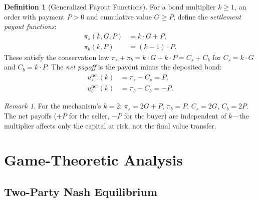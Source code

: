 \documentclass[11pt,a4paper]{article}
\theoremstyle{definition}
\newtheorem{definition}[theorem]{Definition}
\theoremstyle{remark}
\newtheorem{remark}[theorem]{Remark}
\newcommand{\pay}{P}           %
\newcommand{\cumval}{G}        %
\newcommand{\sbond}{C_s}       %
\newcommand{\bbond}{C_b}       %
\newcommand{\spay}{\pi_s}      %
\newcommand{\bpay}{\pi_b}      %
\newcommand{\ub}{u_b}          %
\newcommand{\us}{u_s}          %
\begin{document}
\begin{definition}[Generalized Payout Functions]
\label{def:payout-functions}
For a bond multiplier $k \geq 1$, an order with payment $\pay > 0$
and cumulative value $\cumval \geq \pay$, define the
\emph{settlement payout functions}:
\begin{align}
  \spay(k, \cumval, \pay) &= k \cdot \cumval + \pay,
    \label{eq:general-seller-payout} \\
  \bpay(k, \pay) &= (k - 1) \cdot \pay.
    \label{eq:general-buyer-payout}
\end{align}
These satisfy the conservation law
$\spay + \bpay = k \cdot \cumval + k \cdot \pay = \sbond + \bbond$
for $\sbond = k \cdot \cumval$ and $\bbond = k \cdot \pay$. The
\emph{net payoff} is the payout minus the deposited bond:
\begin{align}
  \us^{\text{net}}(k) &= \spay - \sbond = \pay,
    \label{eq:seller-net} \\
  \ub^{\text{net}}(k) &= \bpay - \bbond = -\pay.
    \label{eq:buyer-net}
\end{align}
\end{definition}

\begin{remark}
For the mechanism's $k = 2$: $\spay = 2\cumval + \pay$,
$\bpay = \pay$, $\sbond = 2\cumval$, $\bbond = 2\pay$. The
net payoffs ($+\pay$ for the seller, $-\pay$ for the buyer) are
independent of $k$---the multiplier affects only the capital at risk,
not the final value transfer.
\end{remark}

\section{Game-Theoretic Analysis}
\label{sec:game-theory}

\subsection{Two-Party Nash Equilibrium}
\end{document}
